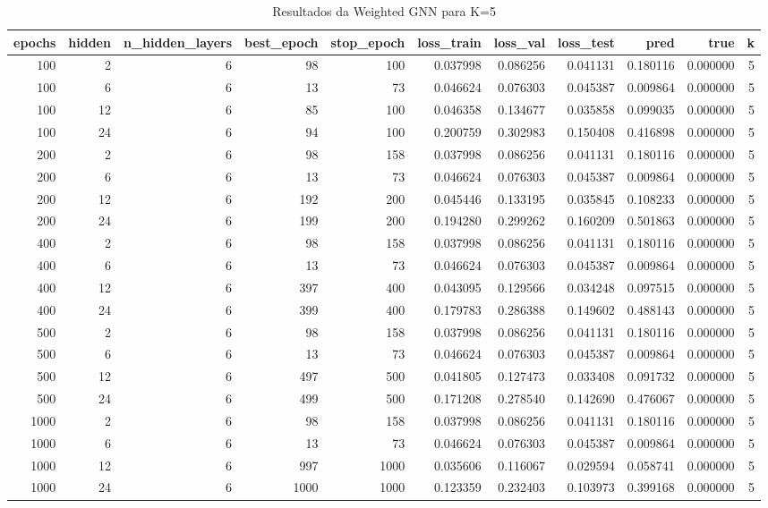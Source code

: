 \begin{table}
\caption{Resultados da Weighted GNN para K=5}
\label{tab:weighted_gnn_results_k5}
\begin{tabular}{rrrrrrrrrrr}
\toprule
epochs & hidden & n\_hidden\_layers & best\_epoch & stop\_epoch & loss\_train & loss\_val & loss\_test & pred & true & k \\
\midrule
100 & 2 & 6 & 98 & 100 & 0.037998 & 0.086256 & 0.041131 & 0.180116 & 0.000000 & 5 \\
100 & 6 & 6 & 13 & 73 & 0.046624 & 0.076303 & 0.045387 & 0.009864 & 0.000000 & 5 \\
100 & 12 & 6 & 85 & 100 & 0.046358 & 0.134677 & 0.035858 & 0.099035 & 0.000000 & 5 \\
100 & 24 & 6 & 94 & 100 & 0.200759 & 0.302983 & 0.150408 & 0.416898 & 0.000000 & 5 \\
200 & 2 & 6 & 98 & 158 & 0.037998 & 0.086256 & 0.041131 & 0.180116 & 0.000000 & 5 \\
200 & 6 & 6 & 13 & 73 & 0.046624 & 0.076303 & 0.045387 & 0.009864 & 0.000000 & 5 \\
200 & 12 & 6 & 192 & 200 & 0.045446 & 0.133195 & 0.035845 & 0.108233 & 0.000000 & 5 \\
200 & 24 & 6 & 199 & 200 & 0.194280 & 0.299262 & 0.160209 & 0.501863 & 0.000000 & 5 \\
400 & 2 & 6 & 98 & 158 & 0.037998 & 0.086256 & 0.041131 & 0.180116 & 0.000000 & 5 \\
400 & 6 & 6 & 13 & 73 & 0.046624 & 0.076303 & 0.045387 & 0.009864 & 0.000000 & 5 \\
400 & 12 & 6 & 397 & 400 & 0.043095 & 0.129566 & 0.034248 & 0.097515 & 0.000000 & 5 \\
400 & 24 & 6 & 399 & 400 & 0.179783 & 0.286388 & 0.149602 & 0.488143 & 0.000000 & 5 \\
500 & 2 & 6 & 98 & 158 & 0.037998 & 0.086256 & 0.041131 & 0.180116 & 0.000000 & 5 \\
500 & 6 & 6 & 13 & 73 & 0.046624 & 0.076303 & 0.045387 & 0.009864 & 0.000000 & 5 \\
500 & 12 & 6 & 497 & 500 & 0.041805 & 0.127473 & 0.033408 & 0.091732 & 0.000000 & 5 \\
500 & 24 & 6 & 499 & 500 & 0.171208 & 0.278540 & 0.142690 & 0.476067 & 0.000000 & 5 \\
1000 & 2 & 6 & 98 & 158 & 0.037998 & 0.086256 & 0.041131 & 0.180116 & 0.000000 & 5 \\
1000 & 6 & 6 & 13 & 73 & 0.046624 & 0.076303 & 0.045387 & 0.009864 & 0.000000 & 5 \\
1000 & 12 & 6 & 997 & 1000 & 0.035606 & 0.116067 & 0.029594 & 0.058741 & 0.000000 & 5 \\
1000 & 24 & 6 & 1000 & 1000 & 0.123359 & 0.232403 & 0.103973 & 0.399168 & 0.000000 & 5 \\
\bottomrule
\end{tabular}
\end{table}
